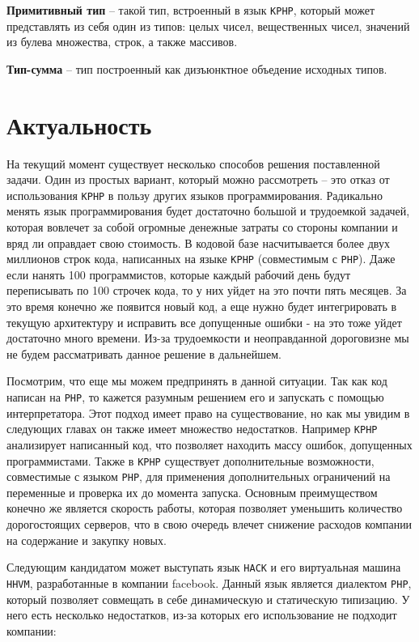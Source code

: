\textbf{Примитивный тип} -- такой тип, встроенный в язык \verb|KPHP|, который может представлять из себя один из типов: целых чисел, вещественных чисел, значений из булева множества, строк, а также массивов.

\textbf{Тип-сумма} -- тип построенный как дизъюнктное объедение исходных типов.

\section{Актуальность}
На текущий момент существует несколько способов решения поставленной задачи. Один из простых вариант, который можно рассмотреть -- это отказ от использования \verb|KPHP| в пользу других языков программирования. 
Радикально менять язык программирования будет достаточно большой и трудоемкой задачей, которая вовлечет за собой огромные денежные затраты со стороны компании и вряд ли оправдает свою стоимость. 
В кодовой базе насчитывается более двух миллионов строк кода, написанных на языке \verb|KPHP| (совместимым с \verb|PHP|).
Даже если нанять 100 программистов, которые каждый рабочий день будут переписывать по 100 строчек кода, то у них уйдет на это почти пять месяцев. За это время конечно же появится новый код, а еще нужно будет интегрировать в текущую архитектуру и исправить все допущенные ошибки - на это тоже уйдет достаточно много времени.
Из-за трудоемкости и неоправданной дороговизне мы не будем рассматривать данное решение в дальнейшем.

Посмотрим, что еще мы можем предпринять в данной ситуации. 
Так как код написан на \verb|PHP|, то кажется разумным решением его и запускать с помощью интерпретатора. 
Этот подход имеет право на существование, но как мы увидим в следующих главах он также имеет множество недостатков.
Например \verb|KPHP| анализирует написанный код, что позволяет находить массу ошибок, допущенных программистами.
Также в \verb|KPHP| существует дополнительные возможности, совместимые с языком \verb|PHP|, для применения дополнительных ограничений на переменные и проверка их до момента запуска.
Основным преимуществом конечно же является скорость работы, которая позволяет уменьшить количество дорогостоящих серверов, что в свою очередь влечет снижение расходов компании на содержание и закупку новых.

Следующим кандидатом может выступать язык \verb|HACK| и его виртуальная машина \verb|HHVM|, разработанные в компании facebook.
Данный язык является диалектом \verb|PHP|, который позволяет совмещать в себе динамическую и статическую типизацию.
У него есть несколько недостатков, из-за которых его использование не подходит компании:

